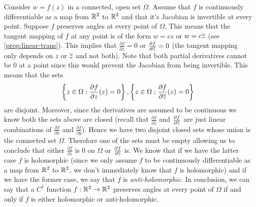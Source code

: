 Consider $w = f(z)$ in a connected, open set $\Omega$. Assume that $f$ is continuously differentiable as a map from $\mathbb{R}^2$ to $\mathbb{R}^2$ and that it's Jacobian is invertible at every point. Suppose $f$ preserves angles at every point of $\Omega$. This means that the tangent mapping of $f$ at any point is of the form $w = cz$ or $w = c\overline{z}$ (see \autoref{prop:linear-trans}). This implies that $\frac{\partial f}{\partial z} = 0$ or $\frac{\partial f}{\partial \overline{z}} = 0$ (the tangent mapping only depends on $z$ or $\overline{z}$ and not both). Note that both partial derivatives cannot be 0 at a point since this would prevent the Jacobian from being invertible. This means that the sets 
$$ \left\{z \in \Omega: \frac{\partial f}{\partial z}(z) = 0 \right\}, \left\{z \in \Omega: \frac{\partial f}{\partial \overline{z}}(z) = 0 \right\} $$
are disjoint. Moreover, since the derivatives are assumed to be continuous we know both the sets above are closed (recall that $\frac{\partial f}{\partial z}$ and $\frac{\partial f}{\partial \overline{z}}$ are just linear combinations of $\frac{\partial f}{\partial x}$ and $\frac{\partial f}{\partial y}$). Hence we have two disjoint closed sets whose union is the connected set $\Omega$. Therefore one of the sets must be empty allowing us to conclude that either $\frac{\partial f}{\partial z}$ is 0 on $\Omega$ or $\frac{\partial f}{\partial \overline{z}}$ is. We know that if we have the latter case $f$ is holomorphic (since we only assume $f$ to be continuously differentiable as a map from $\mathbb{R}^2$ to $\mathbb{R}^2$, we don't immediately know that $f$ is holomorphic) and if we have the former case, we say that $f$ is \textit{anti-holomorphic}. In conclusion, we can say that a $C^1$ function $f: \mathbb{R}^2 \to \mathbb{R}^2$ preserves angles at every point of $\Omega$ if and only if $f$ is either holomorphic or anti-holomorphic.

